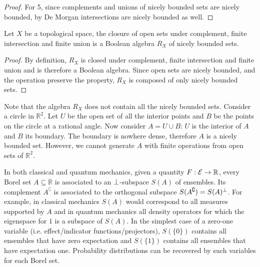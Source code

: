 \begin{mathSection}
\begin{proof}
		For 5, since complements and unions of nicely bounded sets are nicely bounded, by De Morgan intersections are nicely bounded as well.
	\end{proof}
	
	\begin{prop}
		Let $X$ be a topological space, the closure of open sets under complement, finite intersection and finite union is a Boolean algebra $R_X$ of nicely bounded sets.
	\end{prop}
	
	\begin{proof}
		By definition, $R_X$ is closed under complement, finite intersection and finite union and is therefore a Boolean algebra. Since open sets are nicely bounded, and the operation preserve the property, $R_X$ is composed of only nicely bounded sets.
	\end{proof}
	
	\begin{remark}
		Note that the algebra $R_X$ does not contain all the nicely bounded sets. Consider a circle in $\mathbb{R}^2$. Let $U$ be the open set of all the interior points and $B$ be the points on the circle at a rational angle. Now consider $A = U \cup B$: $U$ is the interior of $A$ and $B$ its boundary. The boundary is nowhere dense, therefore $A$ is a nicely bounded set. However, we cannot generate $A$ with finite operations from open sets of $\mathbb{R}^2$.
	\end{remark}
\end{mathSection}



In both classical and quantum mechanics, given a quantity $F : \mathcal{E} \to \mathbb{R}$, every Borel set $A \subseteq \mathbb{R}$ is associated to an $\perp$-subspace $S(A)$ of ensembles. Its complement $A^{\complement}$ is associated to the orthogonal subspace $S(A^{\complement}) = S(A)^\perp$. For example, in classical mechanics $S(A)$ would correspond to all measures supported by $A$ and in quantum mechanics all density operators for which the eigenspace for $1$ is a subspace of $S(A)$. In the simplest case of a zero-one variable (i.e. effect/indicator functions/projectors), $S(\{0\})$ contains all ensembles that have zero expectation and $S(\{1\})$ contains all ensembles that have expectation one. Probability distributions can be recovered by such variables for each Borel set.

